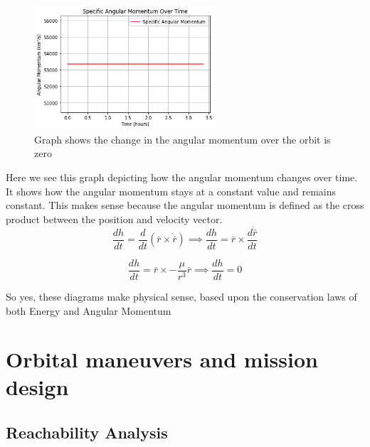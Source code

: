 \documentclass[a4paper, 12pt]{article}  %
\begin{document}
\begin{figure}[H]
    \centering
    \includegraphics[width=0.6\textwidth]{Images/124-L.png}
    \caption{Graph shows the change in the angular momentum over the orbit is zero}
    \label{fig:example}
\end{figure}
\noindent Here we see this graph depicting how the angular momentum changes over time. It shows how the angular momentum stays 
at a constant value and remains constant. This makes sense because the angular momentum is defined as the cross product
between the position and velocity vector.
\setcounter{equation}{0}
\begin{equation}
\frac{dh}{dt} = \frac{d}{dt}(\bar{r} \times \dot{\bar{r}}) \implies \frac{dh}{dt} = \bar{r} \times \frac{d\dot{\bar{r}}}{dt}
\end{equation}

\begin{equation}
\frac{dh}{dt} = \bar{r} \times -\frac{\mu}{r^{3}}\bar{r} \implies \frac{dh}{dt} = 0
\end{equation}
\vspace{0.2cm}

So yes, these diagrams make physical sense, based upon the conservation laws of both Energy and Angular Momentum


\section{Orbital maneuvers and mission design}
\subsection{Reachability Analysis}
\end{document}
